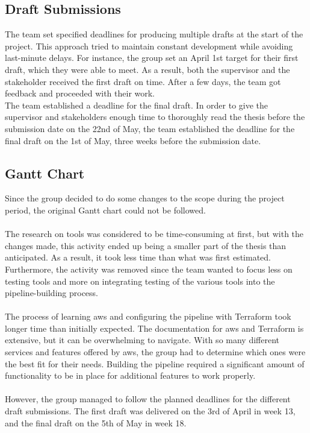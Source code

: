\subsection{Draft Submissions}
The team set specified deadlines for producing multiple drafts at the start of the project. This approach tried to maintain constant development while avoiding last-minute delays. For instance, the group set an April 1st target for their first draft, which they were able to meet. As a result, both the supervisor and the stakeholder received the first draft on time. After a few days, the team got feedback and proceeded with their work. 
\\
The team established a deadline for the final draft. In order to give the supervisor and stakeholders enough time to thoroughly read the thesis before the submission date on the 22nd of May, the team established the deadline for the final draft on the 1st of May, three weeks before the submission date. 


\subsection{Gantt Chart}
Since the group decided to do some changes to the scope during the project period, the original Gantt chart could not be followed. 
\\~\\
The research on tools was considered to be time-consuming at first, but with the changes made, this activity ended up being a smaller part of the thesis than anticipated. As a result, it took less time than what was first estimated. Furthermore, the  activity was removed since the team wanted to focus less on testing tools and more on integrating testing of the various tools into the pipeline-building process. 
\\~\\
The process of learning \acrshort{aws} and configuring the pipeline with Terraform took longer time than initially expected.
The documentation for \acrshort{aws} and Terraform is extensive, but it can be overwhelming to navigate. With so many different services and features offered by \acrshort{aws}, the group had to determine which ones were the best fit for their needs. Building the pipeline required a significant amount of functionality to be in place for additional features to work properly. 
\\~\\
However, the group managed to follow the planned deadlines for the different draft submissions. The first draft was delivered on the 3rd of April in week 13, and the final draft on the 5th of May in week 18. 

